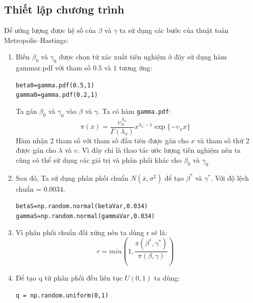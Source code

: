 \documentclass[a4paper]{article}
\begin{document}
\subsection{Thiết lập chương trình}
Để ướng lượng được hệ số của $\beta$ và $\gamma$ ta sử dụng các bước của thuật toán Metropolis–Hastings:
	 \begin{enumerate}
	 \item Biến $\beta_{0}$ và $\gamma_{0}$ được chọn từ xác xuất tiên nghiệm ở đây sử dụng hàm gammar.pdf với tham số $0.5$ và $1$ tương ứng:\\   
	 \begin{mdframed}[hidealllines=true,backgroundcolor=magenta!10]
	 \begin{alltt}
beta0 = gamma.pdf(0.5, 1)
gamma0  = gamma.pdf(0.2, 1)
    \end{alltt}

    \end{mdframed}
    Ta gán $\beta_{0}$ và $\gamma_{0}$ vào $\beta$ và $\gamma$.
    Ta có hàm {\tt gamma.pdf}: 
    $$\pi(x) = \frac{\upsilon_{x}^{\lambda_{x}}}{\Gamma(\lambda_{x})}x^{\lambda_{x}-1}\exp{\{-\upsilon_{x}x\}} $$
        Hàm nhận 2 tham số với tham số đầu tiên được gán cho $x$ và tham số thứ 2 được gán cho $\lambda$ và $\upsilon$.
    Vì đây chỉ là thao tác ước lượng tiên nghiệm nên ta cũng có thể sử dụng các giá trị và phân phối khác cho $\beta_{0}$ và $\gamma_{0}$ 
     \item Sau đó, Ta sử dụng phân phối chuẩn $N(\overline{x}, \sigma^2)$ để tạo $\beta^{*}$ và $\gamma^{*}$. Với độ lệch chuẩn = $0.0034$.
     \begin{mdframed}[hidealllines=true,backgroundcolor=magenta!10]
            \begin{alltt}
betaS = np.random.normal(betaVar, 0.034) 
gammaS = np.random.normal(gammaVar, 0.034)
            \end{alltt}
    \end{mdframed}
     \item Vì phân phối chuẩn đối xứng nên ta dùng r sẽ là:\\
     $$r = min(1,\frac{\pi(\beta^{*},\gamma^{*})}{\pi(\beta,\gamma)})$$
     
     \item Để tạo q từ phân phối đều liên tục $U(0,1)$ ta dùng:
     \begin{mdframed}[hidealllines=true,backgroundcolor=magenta!10]
     \begin{alltt}
     \lstinline{q = np.random.uniform(0,1)}
     \end{alltt}
     \end{mdframed}
     

\end{enumerate}
\end{document}
